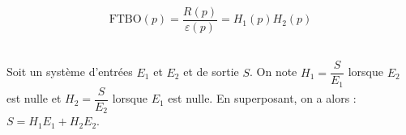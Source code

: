 \documentclass[10pt,fleqn]{article} %
\begin{document}
\begin{defi} ~\\

\vspace{-.6cm}

\begin{minipage}[c]{.48\linewidth}
$$\text{FTBO}(p)=\dfrac{R(p)}{\varepsilon(p)}=H_1(p) H_2(p)$$
\end{minipage}\hfill
\begin{minipage}[c]{.48\linewidth}
\begin{center}
\end{center} 
\end{minipage}

\end{defi}

%
%
%
%
%
%
%

\begin{defi} ~\\
Soit un système d'entrées $E_1$ et $E_2$ et de sortie $S$. On note $H_1=\dfrac{S}{E_1}$ lorsque $E_2$ est nulle et $H_2=\dfrac{S}{E_2}$ lorsque $E_1$ est nulle. En superposant, on a alors : $S=H_1 E_1 + H_2 E_2$.
\end{defi}
\end{document}
